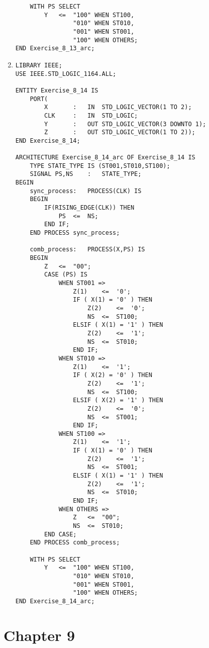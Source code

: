 \begin{enumerate}
\begin{lstlisting}
	WITH PS SELECT
		Y	<=	"100" WHEN ST100,
				"010" WHEN ST010,
				"001" WHEN ST001,
				"100" WHEN OTHERS;
END Exercise_8_13_arc;
	\end{lstlisting}

	\item \begin{lstlisting}
LIBRARY IEEE;
USE IEEE.STD_LOGIC_1164.ALL;

ENTITY Exercise_8_14 IS
	PORT(
		X		:	IN	STD_LOGIC_VECTOR(1 TO 2);
		CLK		:	IN	STD_LOGIC;
		Y		:	OUT	STD_LOGIC_VECTOR(3 DOWNTO 1);
		Z		:	OUT	STD_LOGIC_VECTOR(1 TO 2));
END Exercise_8_14;

ARCHITECTURE Exercise_8_14_arc OF Exercise_8_14 IS
	TYPE STATE_TYPE IS (ST001,ST010,ST100);
	SIGNAL PS,NS	:	STATE_TYPE;
BEGIN
	sync_process:	PROCESS(CLK) IS
	BEGIN
		IF(RISING_EDGE(CLK)) THEN
			PS	<=	NS;
		END IF;
	END PROCESS sync_process;

	comb_process:	PROCESS(X,PS) IS
	BEGIN
		Z	<=	"00";
		CASE (PS) IS
			WHEN ST001 =>
				Z(1)	<=	'0';
				IF ( X(1) = '0' ) THEN
					Z(2)	<=	'0';
					NS	<=	ST100;
				ELSIF ( X(1) = '1' ) THEN
					Z(2)	<=	'1';
					NS	<=	ST010;
				END IF;
			WHEN ST010 =>
				Z(1)	<=	'1';
				IF ( X(2) = '0' ) THEN
					Z(2)	<=	'1';
					NS	<=	ST100;
				ELSIF ( X(2) = '1' ) THEN
					Z(2)	<=	'0';
					NS	<=	ST001;
				END IF;
			WHEN ST100 =>
				Z(1)	<=	'1';
				IF ( X(1) = '0' ) THEN
					Z(2)	<=	'1';
					NS	<=	ST001;
				ELSIF ( X(1) = '1' ) THEN
					Z(2)	<=	'1';
					NS	<=	ST010;
				END IF;
			WHEN OTHERS =>
				Z	<=	"00";
				NS	<=	ST010;
		END CASE;
	END PROCESS comb_process;

	WITH PS SELECT
		Y	<=	"100" WHEN ST100,
				"010" WHEN ST010,
				"001" WHEN ST001,
				"100" WHEN OTHERS;
END Exercise_8_14_arc;
	\end{lstlisting}
\end{enumerate}

\section*{Chapter 9}

